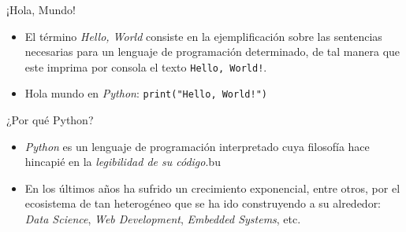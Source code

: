 \documentclass{beamer}
\begin{document}
    \begin{frame}{¡Hola, Mundo!}
      \noindent
      \begin{minipage}{.69\textwidth}
        \begin{itemize}
          \item El término \emph{Hello, World} consiste en la ejemplificación sobre las sentencias necesarias para un lenguaje de programación determinado, de tal manera que este imprima por consola el texto \texttt{Hello, World!}.
          \item Hola mundo en \emph{Python}: \texttt{print("Hello, World!")}
        \end{itemize}
      \end{minipage}
      \begin{minipage}{.29\textwidth}
          \begin{center}
            \fontsize{40}{50}
          \end{center}
      \end{minipage}
    \end{frame}

    \begin{frame}{¿Por qué Python?}
        \noindent
        \begin{minipage}{.29\textwidth}
            \begin{center}
              \fontsize{40}{50}
            \end{center}
        \end{minipage}
        \begin{minipage}{.69\textwidth}
          \begin{itemize}
            \item \emph{Python} es un lenguaje de programación interpretado cuya filosofía hace hincapié en la \emph{legibilidad de su código}.​ bu
            \item En los últimos años ha sufrido un crecimiento exponencial, entre otros, por el ecosistema de tan heterogéneo que se ha ido construyendo a su alrededor: \emph{Data Science}, \emph{Web Development}, \emph{Embedded Systems}, etc.
          \end{itemize}
        \end{minipage}
    \end{frame}
\end{document}
